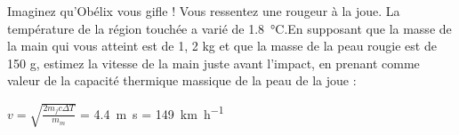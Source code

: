 \begin{Exercise}[title=Vitesse des « baffes » d’Obélix]
		Imaginez qu’Obélix vous gifle ! Vous ressentez une rougeur à la
		joue. La température de la région touchée a varié de \SI{1,8}{\degreeCelsius}.En supposant que la masse de la main qui vous atteint est de	1, 2 kg et que la masse de la peau rougie est de 150 g, estimez la vitesse de la main juste avant l’impact, en prenant comme	valeur de la capacité thermique massique de la peau de la joue : 
\end{Exercise}
\begin{Answer}
		$v= \sqrt{\frac{2m_jc\Delta T}{m_m}}$ = \SI{4,4}{\m\s} = \SI{149}{\km\per\hour}
\end{Answer}
